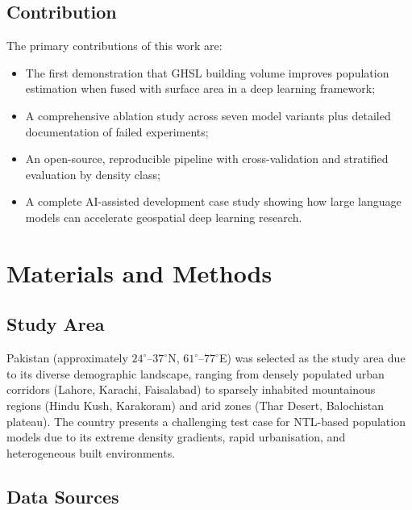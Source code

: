 \documentclass[12pt,a4paper]{article}
\begin{document}
\subsection{Contribution}
\label{subsec:contribution}

The primary contributions of this work are:

\begin{itemize}
    \item The first demonstration that GHSL building volume improves population estimation when fused with surface area in a deep learning framework;
    \item A comprehensive ablation study across seven model variants plus detailed documentation of failed experiments;
    \item An open-source, reproducible pipeline with cross-validation and stratified evaluation by density class;
    \item A complete AI-assisted development case study showing how large language models can accelerate geospatial deep learning research.
\end{itemize}

\section{Materials and Methods}
\label{sec:methods}

\subsection{Study Area}
\label{subsec:studyarea}

Pakistan (approximately $24^{\circ}$--$37^{\circ}$N, $61^{\circ}$--$77^{\circ}$E) was selected as the study area due to its diverse demographic landscape, ranging from densely populated urban corridors (Lahore, Karachi, Faisalabad) to sparsely inhabited mountainous regions (Hindu Kush, Karakoram) and arid zones (Thar Desert, Balochistan plateau). The country presents a challenging test case for NTL-based population models due to its extreme density gradients, rapid urbanisation, and heterogeneous built environments.

\subsection{Data Sources}
\label{subsec:data}
\end{document}
